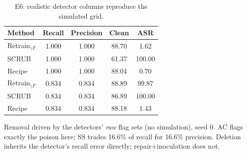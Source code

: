 \begin{table}[t]
\centering
\caption{E6: realistic detector columns reproduce the simulated grid.}
\label{tab:e6}
\footnotesize
\begin{tabular}{lcccc}
\toprule
\textbf{Method} & \textbf{Recall} & \textbf{Precision} & \textbf{Clean} & \textbf{ASR} \\
\midrule
Retrain$_{\setminus F}$ & 1.000 & 1.000 & 88.70 & 1.62 \\
SCRUB & 1.000 & 1.000 & 61.37 & 100.00 \\
Recipe & 1.000 & 1.000 & 88.04 & 0.70 \\
Retrain$_{\setminus F}$ & 0.834 & 0.834 & 88.89 & 99.87 \\
SCRUB & 0.834 & 0.834 & 86.89 & 100.00 \\
Recipe & 0.834 & 0.834 & 88.18 & 1.43 \\
\bottomrule
\end{tabular}
\par\vspace{1pt}\footnotesize\raggedright Removal driven by the detectors' \emph{raw} flag sets (no simulation), seed 0. AC flags exactly the poison here; SS trades 16.6\% of recall for 16.6\% precision. Deletion inherits the detector's recall error directly; repair$+$inoculation does not.
\end{table}
